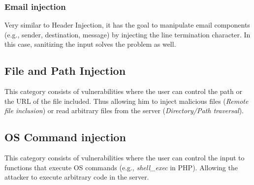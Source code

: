 \subsubsection{Email injection} Very similar to Header Injection, it has the goal to manipulate email components (e.g., sender, destination, message) by injecting the line termination character. In this case, sanitizing the input solves the problem as well.

\subsection{File and Path Injection} This category consists of vulnerabilities where the user can control the path or the URL of the file included. Thus allowing him to inject malicious files (\textit{Remote file inclusion}) or read arbitrary files from the server (\textit{Directory/Path traversal}).


\subsection{OS Command injection} 
This category consists of vulnerabilities where the user can control the input to functions that execute OS commands (e.g., \textit{shell\_exec} in PHP). Allowing the attacker to execute arbitrary code in the server.




